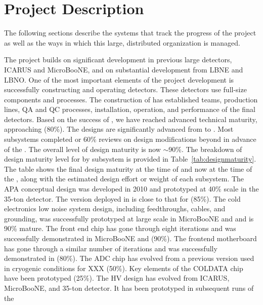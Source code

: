 \section{ Project Description}

The following sections describe the systems that track the progress
of the  project as well as the ways in which this large, distributed organization is managed.

The  project builds on significant development in
previous large  detectors, ICARUS and MicroBooNE, and on substantial development from LBNE and LBNO. One of the most
important elements of the project development is successfully
constructing and operating  detectors. These detectors
use full-size  components and processes. The construction of
 has established teams, production lines, QA and QC
processes, installation, operation, and performance of the final
 detectors. Based on the success of , we have
reached advanced technical maturity, approaching
(80\%). The designs are significantly advanced
from  to . Most subsystems completed 
or 60\% reviews on design modifications beyond  in
advance of the . The overall level of design maturity is now $\sim$90\%. The breakdown of design maturity level for  by
subsystem is provided in Table~\ref{tab:designmaturity}. The table
shows the final  design maturity at the time of  and now
at the time of the , along with the estimated design effort or
weight of each subsystem. The APA conceptual design was developed in
2010 and prototyped at 40\% scale in the 35-ton detector. The
version deployed in  is close to that for 
(85\%). The cold electronics low noise system design, including
feedthroughs, cables, and grounding, was successfully prototyped at large scale in MicroBooNE and  and is 90\% mature. The front end chip has gone through eight iterations and was successfully demonstrated in MicroBooNE and 
(90\%). The frontend motherboard has gone through a similar number of
iterations and was successfully demonstrated in 
(80\%). The ADC chip has evolved from a previous version used in
cryogenic conditions for XXX  (50\%). Key elements of the COLDATA chip
have been prototyped (25\%). The HV design has evolved from ICARUS, MicroBooNE, and 35-ton detector.  It has been prototyped in subsequent runs of the
